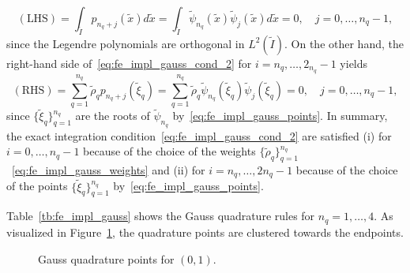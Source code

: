 \begin{equation*}
  (\text{LHS})
  = \int_{\tilde I} p_{n_q+j}(\tilde x) d \tilde x
  = \int_{\tilde I} \tilde \psi_{n_q}(\tilde x) \tilde \psi_{j}(\tilde x) d \tilde x
  = 0, \quad j = 0,\dots,n_q-1,
\end{equation*}
since the Legendre polynomials are orthogonal in $L^2(\tilde I)$. On the other hand, the right-hand side of~\ref{eq:fe_impl_gauss_cond_2} for $i = n_q,\dots,2_{n_q}-1$ yields
\begin{equation*}
  (\text{RHS})
  = \sum_{q=1}^{n_q} \tilde \rho_q p_{n_q+j}(\tilde \xi_q)
  = \sum_{q=1}^{n_q} \tilde \rho_q \tilde \psi_{n_q}(\tilde \xi_q) \tilde \psi_{j}(\tilde \xi_q)
  = 0, \quad j = 0,\dots,n_q-1,
\end{equation*}
since $\{\tilde \xi_q\}_{q=1}^{n_q}$ are the roots of $\tilde \psi_{n_q}$ by~\eqref{eq:fe_impl_gauss_points}. In summary, the exact integration condition~\ref{eq:fe_impl_gauss_cond_2} are satisfied (i) for $i = 0,\dots,n_q-1$ because of the choice of the weights $\{\tilde \rho_q\}_{q=1}^{n_q}$ ~\eqref{eq:fe_impl_gauss_weights} and (ii) for $i = n_q, \dots, 2 n_q-1$ because of the choice of the points $\{\tilde \xi_q\}_{q=1}^{n_q}$ by~\eqref{eq:fe_impl_gauss_points}.

Table~\ref{tb:fe_impl_gauss} shows the Gauss quadrature rules for $n_q = 1,\dots,4$.  As visualized in Figure~\ref{fig:fe_impl_gauss_points}, the quadrature points are clustered towards the endpoints.
\begin{figure}
  \centering
  \caption{Gauss quadrature points for $(0,1)$. \label{fig:fe_impl_gauss_points}}
\end{figure}

